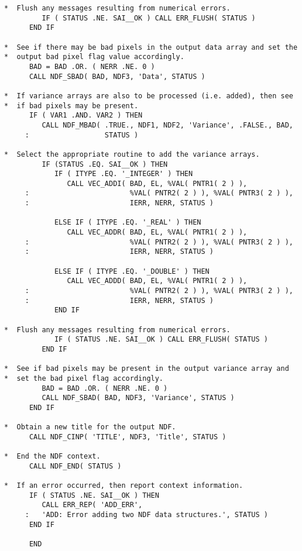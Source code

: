 \begin{verbatim}
*  Flush any messages resulting from numerical errors.
         IF ( STATUS .NE. SAI__OK ) CALL ERR_FLUSH( STATUS )
      END IF

*  See if there may be bad pixels in the output data array and set the
*  output bad pixel flag value accordingly.
      BAD = BAD .OR. ( NERR .NE. 0 )
      CALL NDF_SBAD( BAD, NDF3, 'Data', STATUS )

*  If variance arrays are also to be processed (i.e. added), then see
*  if bad pixels may be present.
      IF ( VAR1 .AND. VAR2 ) THEN
         CALL NDF_MBAD( .TRUE., NDF1, NDF2, 'Variance', .FALSE., BAD,
     :                  STATUS )

*  Select the appropriate routine to add the variance arrays.
         IF (STATUS .EQ. SAI__OK ) THEN
            IF ( ITYPE .EQ. '_INTEGER' ) THEN
               CALL VEC_ADDI( BAD, EL, %VAL( PNTR1( 2 ) ),
     :                        %VAL( PNTR2( 2 ) ), %VAL( PNTR3( 2 ) ),
     :                        IERR, NERR, STATUS )

            ELSE IF ( ITYPE .EQ. '_REAL' ) THEN
               CALL VEC_ADDR( BAD, EL, %VAL( PNTR1( 2 ) ),
     :                        %VAL( PNTR2( 2 ) ), %VAL( PNTR3( 2 ) ),
     :                        IERR, NERR, STATUS )

            ELSE IF ( ITYPE .EQ. '_DOUBLE' ) THEN
               CALL VEC_ADDD( BAD, EL, %VAL( PNTR1( 2 ) ),
     :                        %VAL( PNTR2( 2 ) ), %VAL( PNTR3( 2 ) ),
     :                        IERR, NERR, STATUS )
            END IF

*  Flush any messages resulting from numerical errors.
            IF ( STATUS .NE. SAI__OK ) CALL ERR_FLUSH( STATUS )
         END IF

*  See if bad pixels may be present in the output variance array and
*  set the bad pixel flag accordingly.
         BAD = BAD .OR. ( NERR .NE. 0 )
         CALL NDF_SBAD( BAD, NDF3, 'Variance', STATUS )
      END IF

*  Obtain a new title for the output NDF.
      CALL NDF_CINP( 'TITLE', NDF3, 'Title', STATUS )
      
*  End the NDF context.
      CALL NDF_END( STATUS )

*  If an error occurred, then report context information.
      IF ( STATUS .NE. SAI__OK ) THEN
         CALL ERR_REP( 'ADD_ERR',
     :   'ADD: Error adding two NDF data structures.', STATUS )
      END IF

      END
\end{verbatim}
\normalsize

